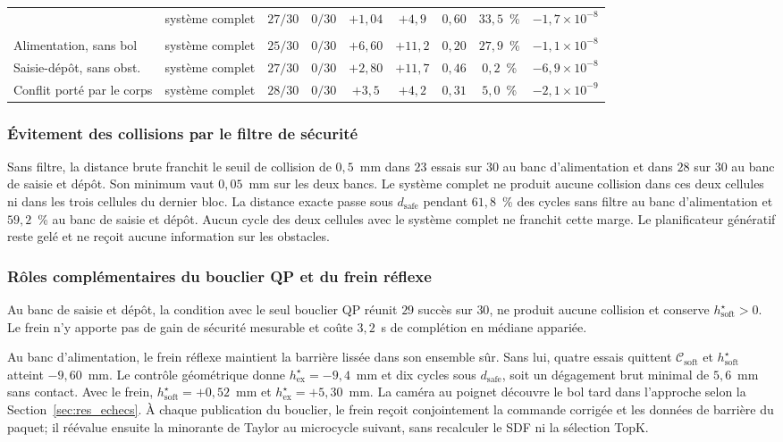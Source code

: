 \begin{table}[htbp]
\begin{tabular}{llccccccc}
 & système complet    & $27/30$ & $0/30$  & $+1{,}04$  & $+4{,}9$  & $0{,}60$ & $33{,}5$~\% & $-1{,}7\times10^{-8}$ \\
\addlinespace
\multicolumn{9}{l}{Système complet seul} \\
Alimentation, sans bol      & système complet & $25/30$ & $0/30$ & $+6{,}60$ & $+11{,}2$ & $0{,}20$ & $27{,}9$~\% & $-1{,}1\times10^{-8}$ \\
Saisie-dépôt, sans obst.   & système complet & $27/30$ & $0/30$ & $+2{,}80$ & $+11{,}7$ & $0{,}46$ & $0{,}2$~\%  & $-6{,}9\times10^{-8}$ \\
Conflit porté par le corps  & système complet & $28/30$ & $0/30$ & $+3{,}5$ & $+4{,}2$  & $0{,}31$ & $5{,}0$~\%  & $-2{,}1\times10^{-9}$ \\
\bottomrule
\end{tabular}
\end{table}

\subsubsection{Évitement des collisions par le filtre de sécurité}
Sans filtre, la distance brute franchit le seuil de collision de $0{,}5$~mm dans $23$ essais sur $30$ au banc d'alimentation et dans $28$ sur $30$ au banc de saisie et dépôt. Son minimum vaut $0{,}05$~mm sur les deux bancs. Le système complet ne produit aucune collision dans ces deux cellules ni dans les trois cellules du dernier bloc. La distance exacte passe sous $d_{\mathrm{safe}}$ pendant $61{,}8$~\% des cycles sans filtre au banc d'alimentation et $59{,}2$~\% au banc de saisie et dépôt. Aucun cycle des deux cellules avec le système complet ne franchit cette marge. Le planificateur génératif reste gelé et ne reçoit aucune information sur les obstacles.

\subsubsection{Rôles complémentaires du bouclier QP et du frein réflexe}
Au banc de saisie et dépôt, la condition avec le seul bouclier \ac{QP} réunit $29$ succès sur $30$, ne produit aucune collision et conserve $h_{\mathrm{soft}}^{\star}>0$. Le frein n'y apporte pas de gain de sécurité mesurable et coûte $3{,}2$~s de complétion en médiane appariée.

Au banc d'alimentation, le frein réflexe maintient la barrière lissée dans son ensemble sûr. Sans lui, quatre essais quittent $\mathcal{C}_{\mathrm{soft}}$ et $h_{\mathrm{soft}}^{\star}$ atteint $-9{,}60$~mm. Le contrôle géométrique donne $h_{\mathrm{ex}}^{\star}=-9{,}4$~mm et dix cycles sous $d_{\mathrm{safe}}$, soit un dégagement brut minimal de $5{,}6$~mm sans contact. Avec le frein, $h_{\mathrm{soft}}^{\star}=+0{,}52$~mm et $h_{\mathrm{ex}}^{\star}=+5{,}30$~mm. La caméra au poignet découvre le bol tard dans l'approche selon la Section~\ref{sec:res_echecs}. À chaque publication du bouclier, le frein reçoit conjointement la commande corrigée et les données de barrière du paquet; il réévalue ensuite la minorante de Taylor au microcycle suivant, sans recalculer le \ac{SDF} ni la sélection TopK.

